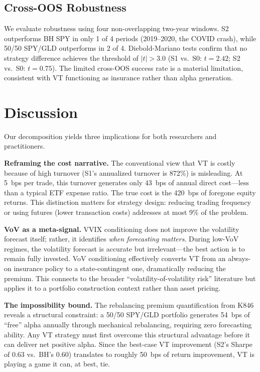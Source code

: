 \documentclass[12pt,a4paper]{article}
\begin{document}
\subsection{Cross-OOS Robustness}

We evaluate robustness using four non-overlapping two-year windows. S2 outperforms BH SPY in only 1 of 4 periods (2019--2020, the COVID crash), while 50/50 SPY/GLD outperforms in 2 of 4. Diebold-Mariano tests confirm that no strategy difference achieves the \citet{harvey2016} threshold of $|t| > 3.0$ (S1 vs.\ S0: $t = 2.42$; S2 vs.\ S0: $t = 0.75$). The limited cross-OOS success rate is a material limitation, consistent with VT functioning as insurance rather than alpha generation.

\section{Discussion}
\label{sec:discussion}

Our decomposition yields three implications for both researchers and practitioners.

\textbf{Reframing the cost narrative.} The conventional view that VT is costly because of high turnover (S1's annualized turnover is 872\%) is misleading. At 5~bps per trade, this turnover generates only 43~bps of annual direct cost---less than a typical ETF expense ratio. The true cost is the 420~bps of foregone equity returns. This distinction matters for strategy design: reducing trading frequency or using futures (lower transaction costs) addresses at most 9\% of the problem.

\textbf{VoV as a meta-signal.} VVIX conditioning does not improve the volatility forecast itself; rather, it identifies \emph{when forecasting matters}. During low-VoV regimes, the volatility forecast is accurate but irrelevant---the best action is to remain fully invested. VoV conditioning effectively converts VT from an always-on insurance policy to a state-contingent one, dramatically reducing the premium. This connects to the broader ``volatility-of-volatility risk'' literature \citep{bollerslev2009, huang2015} but applies it to a portfolio construction context rather than asset pricing.

\textbf{The impossibility bound.} The rebalancing premium quantification from K846 reveals a structural constraint: a 50/50 SPY/GLD portfolio generates 54~bps of ``free'' alpha annually through mechanical rebalancing, requiring zero forecasting ability. Any VT strategy must first overcome this structural advantage before it can deliver net positive alpha. Since the best-case VT improvement (S2's Sharpe of 0.63 vs.\ BH's 0.60) translates to roughly 50~bps of return improvement, VT is playing a game it can, at best, tie.
\end{document}
